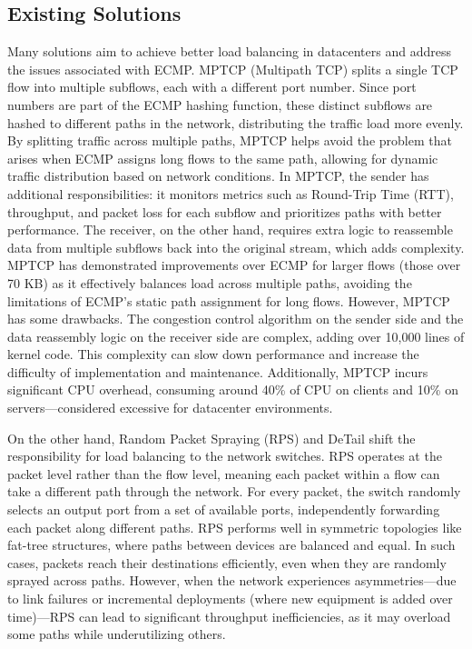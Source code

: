 \documentclass[11pt, sigconf]{acmart}
\begin{document}
\subsection{Existing Solutions}
Many solutions aim to achieve better load balancing in datacenters and address the issues associated with ECMP. MPTCP (Multipath TCP) splits a single TCP flow into multiple subflows, each with a different port number. Since port numbers are part of the ECMP hashing function, these distinct subflows are hashed to different paths in the network, distributing the traffic load more evenly. By splitting traffic across multiple paths, MPTCP helps avoid the problem that arises when ECMP assigns long flows to the same path, allowing for dynamic traffic distribution based on network conditions. In MPTCP, the sender has additional responsibilities: it monitors metrics such as Round-Trip Time (RTT), throughput, and packet loss for each subflow and prioritizes paths with better performance. The receiver, on the other hand, requires extra logic to reassemble data from multiple subflows back into the original stream, which adds complexity. MPTCP has demonstrated improvements over ECMP for larger flows (those over 70 KB) as it effectively balances load across multiple paths, avoiding the limitations of ECMP’s static path assignment for long flows. However, MPTCP has some drawbacks. The congestion control algorithm on the sender side and the data reassembly logic on the receiver side are complex, adding over 10,000 lines of kernel code. This complexity can slow down performance and increase the difficulty of implementation and maintenance. Additionally, MPTCP incurs significant CPU overhead, consuming around 40\% of CPU on clients and 10\% on servers—considered excessive for datacenter environments.

On the other hand, Random Packet Spraying (RPS) and DeTail shift the responsibility for load balancing to the network switches. RPS operates at the packet level rather than the flow level, meaning each packet within a flow can take a different path through the network. For every packet, the switch randomly selects an output port from a set of available ports, independently forwarding each packet along different paths. RPS performs well in symmetric topologies like fat-tree structures, where paths between devices are balanced and equal. In such cases, packets reach their destinations efficiently, even when they are randomly sprayed across paths. However, when the network experiences asymmetries—due to link failures or incremental deployments (where new equipment is added over time)—RPS can lead to significant throughput inefficiencies, as it may overload some paths while underutilizing others.
\end{document}
